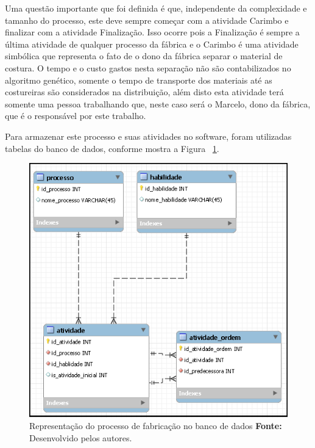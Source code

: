 \par  Uma questão importante que foi definida é que, independente da complexidade e tamanho do processo, este deve sempre começar 
com a atividade Carimbo e finalizar com a atividade Finalização. Isso ocorre pois a Finalização é sempre a última atividade 
de qualquer processo da fábrica e o Carimbo é uma atividade simbólica que representa o fato de o dono da fábrica separar o 
material de costura. O tempo e o custo gastos nesta separação não são contabilizados no algoritmo genético, somente o tempo de 
transporte dos materiais até as costureiras são considerados na distribuição, além disto esta atividade terá somente uma pessoa
trabalhando que, neste caso será o Marcelo, dono da fábrica, que é o responsável por este trabalho.

\par Para armazenar este processo e suas atividades no software, foram utilizadas tabelas do banco de dados, conforme mostra 
a Figura ~\ref{fig:proc_fabri_db}.

\newpage

\begin{figure}[h!]
	\centerline{\includegraphics[scale=0.7]{./imagens/representacao_processo.png}}
	\caption[Representação do processo de fabricação no banco de dados]
	{Representação do processo de fabricação no banco de dados \textbf{Fonte:}
	Desenvolvido pelos autores.}
	\label{fig:proc_fabri_db}
\end{figure}


